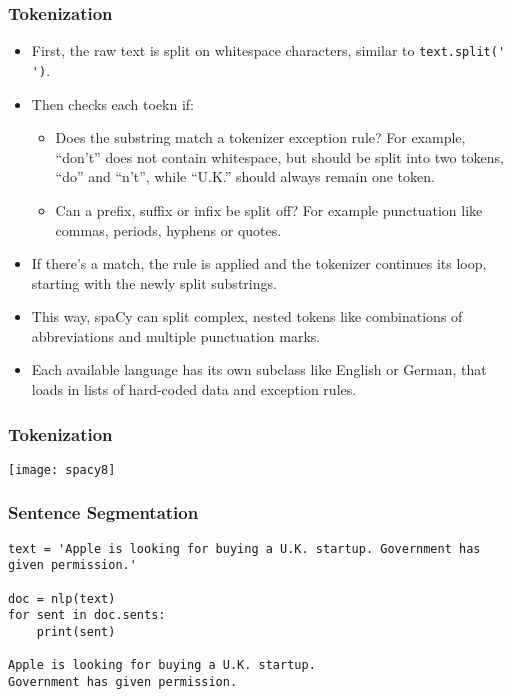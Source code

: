 \begin{frame}[fragile]\frametitle{Tokenization}

\begin{itemize}
\item First, the raw text is split on whitespace characters, similar to \lstinline|text.split(' ')|.
\item Then checks each toekn if:
\begin{itemize}
\item Does the substring match a tokenizer exception rule? For example, “don’t” does not contain whitespace, but should be split into two tokens, “do” and “n’t”, while “U.K.” should always remain one token.
\item Can a prefix, suffix or infix be split off? For example punctuation like commas, periods, hyphens or quotes.
\end{itemize}

\item If there’s a match, the rule is applied and the tokenizer continues its loop, starting with the newly split substrings. 
\item This way, spaCy can split complex, nested tokens like combinations of abbreviations and multiple punctuation marks.
\item Each available language has its own subclass like English or German, that loads in lists of hard-coded data and exception rules.
\end{itemize}
\end{frame}

\begin{frame}[fragile]\frametitle{Tokenization}

\begin{center}
\texttt{[image: spacy8]}
\end{center}

\end{frame}


\begin{frame}[fragile]\frametitle{Sentence Segmentation}

\begin{lstlisting}
text = 'Apple is looking for buying a U.K. startup. Government has given permission.'

doc = nlp(text)
for sent in doc.sents:
    print(sent)
		
Apple is looking for buying a U.K. startup.
Government has given permission.
\end{lstlisting}
	
\end{frame}


